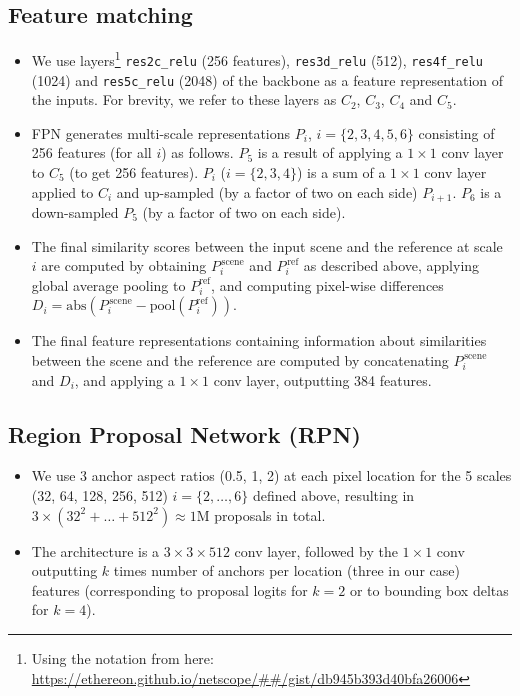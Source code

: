 \documentclass{article}
\begin{document}
\subsection{Feature matching}
\begin{itemize}[nosep]
    \item We use layers\footnote{Using the notation from here: \url{https://ethereon.github.io/netscope/##/gist/db945b393d40bfa26006}} \texttt{res2c\_relu} (256 features), \texttt{res3d\_relu} (512), \texttt{res4f\_relu} (1024) and \texttt{res5c\_relu} (2048) of the backbone as a feature representation of the inputs. For brevity, we refer to these layers as $C_2$, $C_3$, $C_4$ and $C_5$.
    \item FPN generates multi-scale representations $P_i$, $i = \{2,3,4,5, 6\}$ consisting of 256 features (for all $i$) as follows. $P_5$ is a result of applying a $1 \times 1$ conv layer to $C_5$ (to get 256 features). $P_i$ ($i = \{2,3,4\}$) is a sum of a $1\times1$ conv layer applied to $C_i$ and up-sampled (by a factor of two on each side) $P_{i+1}$. $P_6$ is a down-sampled $P_5$ (by a factor of two on each side).
    \item The final similarity scores between the input scene and the reference at scale $i$ are computed by obtaining $P_i^{\,\text{scene}}$ and $P_i^{\,\text{ref}}$ as described above, applying global average pooling to $P_i^{\text{ref}}$, and computing pixel-wise differences $D_i = \text{abs}(P_i^{\,\text{scene}} - \text{pool}(P_i^{\text{ref}}))$. 
    \item The final feature representations containing information about similarities between the scene and the reference are computed by concatenating $P_i^{\,\text{scene}}$ and $D_i$, and applying a $1\times1$ conv layer, outputting 384 features.
\end{itemize}

\subsection{Region Proposal Network (RPN)}
\begin{itemize}[nosep]
    \item We use 3 anchor aspect ratios (0.5, 1, 2) at each pixel location for the 5 scales (32, 64, 128, 256, 512) $i = \{2, \ldots, 6\}$ defined above, resulting in $3 \times (32^2 + \ldots + 512^2) \approx 1\text{M}$ proposals in total.
    \item The architecture is a $3 \times 3 \times 512$ conv layer, followed by the $1 \times 1$ conv outputting $k$ times number of anchors per location (three in our case) features (corresponding to proposal logits for $k = 2$ or to bounding box deltas for $k = 4$).
\end{itemize}
\end{document}
